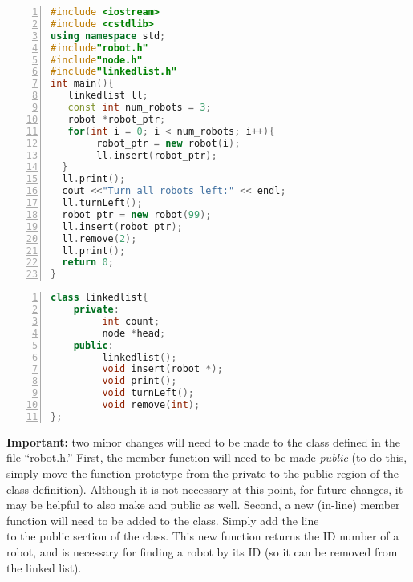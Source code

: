 \begin{minipage}{\textwidth}
\renewcommand*\thelstnumber{\the\value{lstnumber}}
\begin{lstlisting}[language=C++,numbers = left,xleftmargin=4.0ex, basicstyle=\small, emph={ll,num_robots,robot_ptr,i},emphstyle = \color{\mycolor},
showstringspaces=false,
caption = {Main program for the Linked Robots program.  The include statements (lines 4, 5, and 6) automatically include the code from the other listings.},
label={listing:robotlinkedlist}]
#include <iostream>
#include <cstdlib>
using namespace std;
#include"robot.h"
#include"node.h"
#include"linkedlist.h"
int main(){
   linkedlist ll;
   const int num_robots = 3;
   robot *robot_ptr;
   for(int i = 0; i < num_robots; i++){
        robot_ptr = new robot(i);
        ll.insert(robot_ptr);
  }
  ll.print();
  cout <<"Turn all robots left:" << endl;
  ll.turnLeft();
  robot_ptr = new robot(99);
  ll.insert(robot_ptr);
  ll.remove(2);
  ll.print();
  return 0;
}
\end{lstlisting}
\end{minipage}

\begin{minipage}{\textwidth}
\renewcommand*\thelstnumber{\the\value{lstnumber}a}
\begin{lstlisting}[language=C++,numbers = left,xleftmargin=4.0ex, basicstyle=\small, emph={count,head},emphstyle = \color{\mycolor},
showstringspaces=false,
caption = {The declaration of the \cf{linkedlist} class, which holds the ``head'' of the linked list.},
label={listing:llh}]
class linkedlist{
    private:
         int count;
         node *head;
    public:
         linkedlist();
         void insert(robot *);
         void print();
         void turnLeft();
         void remove(int);
};
\end{lstlisting}
\end{minipage}

\textbf{Important:} two minor changes will need to be made to the  class defined in the file ``robot.h.''  First, the member function  will need to be made \emph{public} (to do this, simply move the function prototype from the private to the public region of the class definition). Although it is not necessary at this point, for future changes, it may be helpful to also make  and  public as well.  Second, a new (in-line) member function will need to be added to the  class.  Simply add the line\\
to the public section of the  class.  This new function returns the ID number of a robot, and is necessary for finding a robot by its ID (so it can be removed from the linked list).

